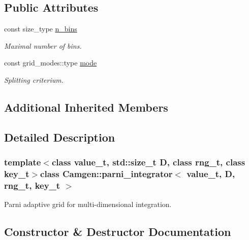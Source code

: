 \subsection*{Public Attributes}
\begin{DoxyCompactItemize}
\item 
\hypertarget{a00395_a33af3af600441e06f9c0cb7e21ed0603}{}const size\+\_\+type \hyperlink{a00395_a33af3af600441e06f9c0cb7e21ed0603}{n\+\_\+bins}\label{a00395_a33af3af600441e06f9c0cb7e21ed0603}

\begin{DoxyCompactList}\small\item\em Maximal number of bins. \end{DoxyCompactList}\item 
\hypertarget{a00395_a419381ed662909319d41cbb784573e1d}{}const grid\+\_\+modes\+::type \hyperlink{a00395_a419381ed662909319d41cbb784573e1d}{mode}\label{a00395_a419381ed662909319d41cbb784573e1d}

\begin{DoxyCompactList}\small\item\em Splitting criterium. \end{DoxyCompactList}\end{DoxyCompactItemize}
\subsection*{Additional Inherited Members}


\subsection{Detailed Description}
\subsubsection*{template$<$class value\+\_\+t, std\+::size\+\_\+t D, class rng\+\_\+t, class key\+\_\+t$>$class Camgen\+::parni\+\_\+integrator$<$ value\+\_\+t, D, rng\+\_\+t, key\+\_\+t $>$}

Parni adaptive grid for multi-\/dimensional integration. 

\subsection{Constructor \& Destructor Documentation}
\hypertarget{a00395_adf939625bbca4ef9d79d3e12b79369d1}{}
